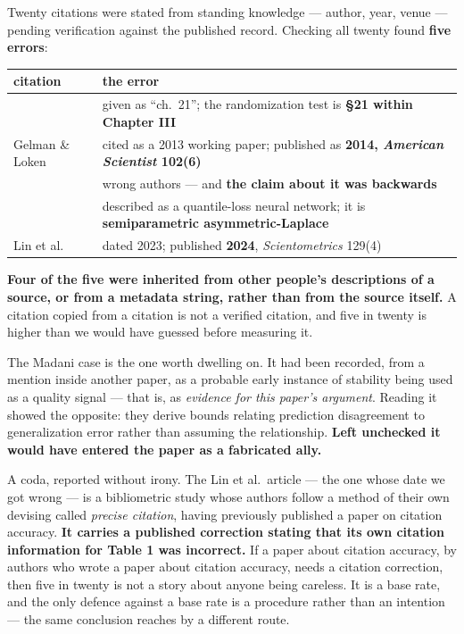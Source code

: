 Twenty citations were stated from standing knowledge --- author, year, venue --- pending
verification against the published record. Checking all twenty found \textbf{five errors}:

{\def\LTcaptype{none} %
\begin{longtable}[]{@{}
  >{\raggedright\arraybackslash}p{}
  >{\raggedright\arraybackslash}p{}@{}}
\toprule\noalign{}
\begin{minipage}[b]{\linewidth}\raggedright
citation
\end{minipage} & \begin{minipage}[b]{\linewidth}\raggedright
the error
\end{minipage} \\
\midrule\noalign{}
\endhead
\bottomrule\noalign{}
\endlastfoot
\citet{fisher1935design} & given as ``ch.~21''; the randomization test is \textbf{\S21 within Chapter III} \\
Gelman \& Loken & cited as a 2013 working paper; published as \textbf{2014, \emph{American Scientist} 102(6)} \\
\citet{madani2004covalidation} & wrong authors --- and \textbf{the claim about it was backwards} \\
\citet{taylor2019forecasting} & described as a quantile-loss neural network; it is \textbf{semiparametric asymmetric-Laplace} \\
Lin et al. & dated 2023; published \textbf{2024}, \emph{Scientometrics} 129(4) \\
\end{longtable}
}

\textbf{Four of the five were inherited from other people's descriptions of a source, or from a
metadata string, rather than from the source itself.} A citation copied from a citation is not
a verified citation, and five in twenty is higher than we would have guessed before measuring it.

The Madani case is the one worth dwelling on. It had been recorded, from a mention inside another
paper, as a probable early instance of stability being used as a quality signal --- that is, as
\emph{evidence for this paper's argument}. Reading it showed the opposite: they derive bounds relating
prediction disagreement to generalization error rather than assuming the relationship. \textbf{Left
unchecked it would have entered the paper as a fabricated ally.}

A coda, reported without irony. The Lin et al.~article --- the one whose date we got wrong --- is a
bibliometric study whose authors follow a method of their own devising called \emph{precise citation},
having previously published a paper on citation accuracy. \textbf{It carries a published correction
stating that its own citation information for Table 1 was incorrect.} If a paper about citation
accuracy, by authors who wrote a paper about citation accuracy, needs a citation correction, then
five in twenty is not a story about anyone being careless. It is a base rate, and the only
defence against a base rate is a procedure rather than an intention --- the same conclusion 
reaches by a different route.

